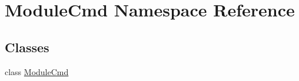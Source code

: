 \hypertarget{namespaceModuleCmd}{\section{Module\-Cmd Namespace Reference}
\label{namespaceModuleCmd}
}
\subsection*{Classes}
\begin{DoxyCompactItemize}
\item 
class \hyperlink{classModuleCmd_1_1ModuleCmd}{Module\-Cmd}
\end{DoxyCompactItemize}
